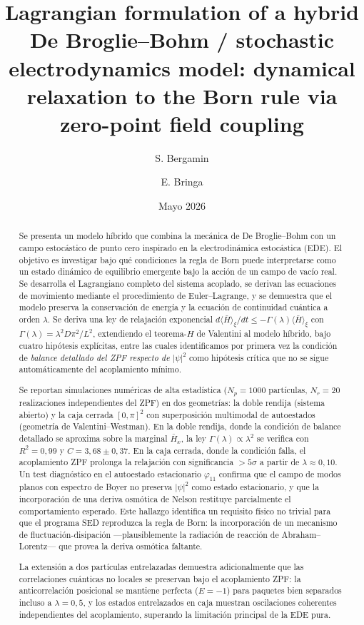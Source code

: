 \documentclass[11pt,a4paper]{article}
\title{Lagrangian formulation of a hybrid De Broglie--Bohm /
stochastic electrodynamics model: dynamical relaxation to the Born rule
via zero-point field coupling}
\author{S. Bergamin \and E. Bringa}
\date{Mayo 2026}
\begin{document}
\maketitle

\begin{abstract}
Se presenta un modelo híbrido que combina la mecánica de De Broglie--Bohm
con un campo estocástico de punto cero inspirado en la electrodinámica
estocástica (EDE). El objetivo es investigar bajo qué condiciones la regla
de Born puede interpretarse como un estado dinámico de equilibrio
emergente bajo la acción de un campo de vacío real. Se desarrolla el
Lagrangiano completo del sistema acoplado, se derivan las ecuaciones de
movimiento mediante el procedimiento de Euler--Lagrange, y se demuestra
que el modelo preserva la conservación de energía y la ecuación de
continuidad cuántica a orden $\lambda$. Se deriva una ley de relajación
exponencial $d\langle\bar{H}\rangle_\xi/dt\leq -\Gamma(\lambda)
\langle\bar{H}\rangle_\xi$ con $\Gamma(\lambda)=\lambda^2 D\pi^2/L^2$,
extendiendo el teorema-$H$ de Valentini al modelo híbrido, bajo cuatro
hipótesis explícitas, entre las cuales identificamos por primera vez la
condición de \emph{balance detallado del ZPF respecto de $|\psi|^2$} como
hipótesis crítica que no se sigue automáticamente del acoplamiento mínimo.

Se reportan simulaciones numéricas de alta estadística ($N_p=1000$
partículas, $N_r=20$ realizaciones independientes del ZPF) en dos
geometrías: la doble rendija (sistema abierto) y la caja cerrada
$[0,\pi]^2$ con superposición multimodal de autoestados (geometría de
Valentini--Westman). En la doble rendija, donde la condición de balance
detallado se aproxima sobre la marginal $\bar{H}_x$, la ley
$\Gamma(\lambda)\propto\lambda^2$ se verifica con $R^2=0{,}99$ y
$C=3{,}68\pm 0{,}37$. En la caja cerrada, donde la condición falla, el
acoplamiento ZPF prolonga la relajación con significancia $>5\sigma$ a
partir de $\lambda\approx 0{,}10$. Un test diagnóstico en el autoestado
estacionario $\varphi_{11}$ confirma que el campo de modos planos con
espectro de Boyer no preserva $|\psi|^2$ como estado estacionario, y que
la incorporación de una deriva osmótica de Nelson restituye parcialmente
el comportamiento esperado. Este hallazgo identifica un requisito físico
no trivial para que el programa SED reproduzca la regla de Born: la
incorporación de un mecanismo de fluctuación-disipación
---plausiblemente la radiación de reacción de Abraham--Lorentz--- que
provea la deriva osmótica faltante.

La extensión a dos partículas entrelazadas demuestra adicionalmente que
las correlaciones cuánticas no locales se preservan bajo el acoplamiento
ZPF: la anticorrelación posicional se mantiene perfecta ($E=-1$) para
paquetes bien separados incluso a $\lambda=0{,}5$, y los estados
entrelazados en caja muestran oscilaciones coherentes independientes del
acoplamiento, superando la limitación principal de la EDE pura.
\end{abstract}
\end{document}

